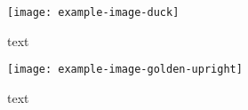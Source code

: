 \documentclass{beamer}
\begin{document}
\begin{frame}
    \begin{varwidth}{\textwidth}
        \begin{figure}
            \texttt{[image: example-image-duck]}
            \caption{text}
        \end{figure}
    \end{varwidth}
    \hfill
    \begin{varwidth}{\textwidth}
        \begin{figure}
            \texttt{[image: example-image-golden-upright]}
            \caption{text}
        \end{figure}
    \end{varwidth}
\end{frame} 
\end{document}
